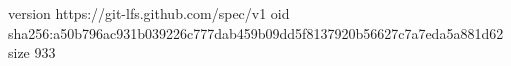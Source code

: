 version https://git-lfs.github.com/spec/v1
oid sha256:a50b796ac931b039226c777dab459b09dd5f8137920b56627c7a7eda5a881d62
size 933
